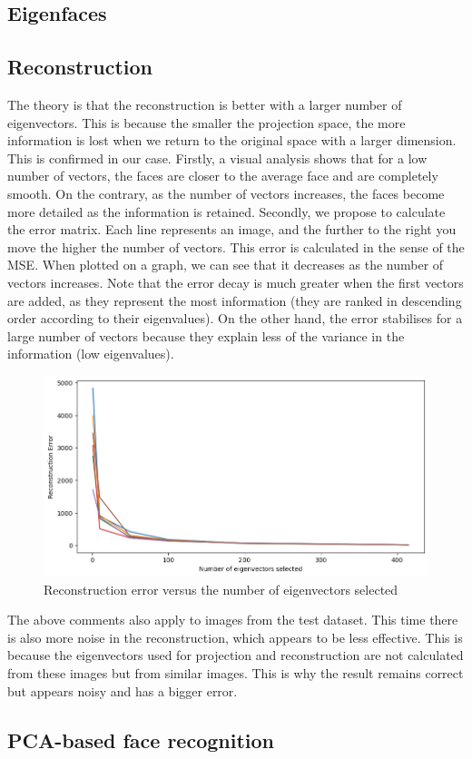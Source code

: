 \subsection{Eigenfaces}

\subsection{Reconstruction}

The theory is that the reconstruction is better with a larger number of eigenvectors. This is because the smaller the projection space, the more information is lost when we return to the original space with a larger dimension. This is confirmed in our case. Firstly, a visual analysis shows that for a low number of vectors, the faces are closer to the average face and are completely smooth. On the contrary, as the number of vectors increases, the faces become more detailed as the information is retained. Secondly, we propose to calculate the error matrix. Each line represents an image, and the further to the right you move the higher the number of vectors. This error is calculated in the sense of the MSE. When plotted on a graph, we can see that it decreases as the number of vectors increases. Note that the error decay is much greater when the first vectors are added, as they represent the most information (they are ranked in descending order according to their eigenvalues). On the other hand, the error stabilises for a large number of vectors because they explain less of the variance in the information (low eigenvalues).

\begin{figure}[h]
	\centering
	\includegraphics[width=12.0cm]{./Ressources/Reconstruction_error.png}
	\vspace{-3mm}
	\caption{Reconstruction error versus the number of eigenvectors selected}
	\label{fig:rect_result}
\end{figure}

The above comments also apply to images from the test dataset. This time there is also more noise in the reconstruction, which appears to be less effective. This is because the eigenvectors used for projection and reconstruction are not calculated from these images but from similar images. This is why the result remains correct but appears noisy and has a bigger error.

\subsection{PCA-based face recognition}



